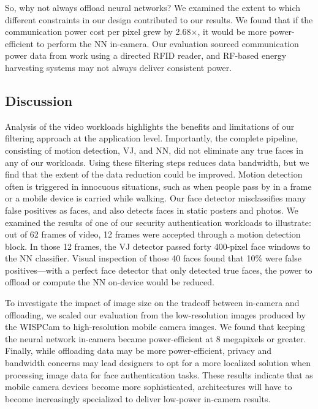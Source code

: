 So, why not always offload neural networks? We examined the extent to which different constraints in our design contributed to our results. We found that if the communication power cost per pixel grew by 2.68$\times$, it would be more power-efficient to perform the NN in-camera. Our evaluation sourced communication power data from work using a directed RFID reader, and RF-based energy harvesting systems may not always deliver consistent power.

\subsection{Discussion}

Analysis of the video workloads highlights the benefits and limitations of our filtering approach at the application level. Importantly, the complete pipeline, consisting of motion detection, VJ, and NN, did not eliminate any true faces in any of our workloads. Using these filtering steps reduces data bandwidth, but we find that the extent of the data reduction could be improved. Motion detection often is triggered in innocuous situations, such as when people pass by in a frame or a mobile device is carried while walking. Our face detector misclassifies many false positives as faces, and also detects faces in static posters and photos. We examined the results of one of our security authentication workloads to illustrate: out of 62 frames of video, 12 frames were accepted through a motion detection block. In those 12 frames, the VJ detector passed forty 400-pixel face windows to the NN classifier. Visual inspection of those 40 faces found that 10\% were false positives---with a perfect face detector that only detected true faces, the power to offload or compute the NN on-device would be reduced.

To investigate the impact of image size on the tradeoff between in-camera and offloading, we scaled our evaluation from the low-resolution images produced by the WISPCam to high-resolution mobile camera images. We found that keeping the neural network in-camera became power-efficient at 8 megapixels or greater. Finally, while offloading data may be more power-efficient, privacy and bandwidth concerns may lead designers to opt for a more localized solution when processing image data for face authentication tasks. These results indicate that as mobile camera devices become more sophisticated, architectures will have to become increasingly specialized to deliver low-power in-camera results.


